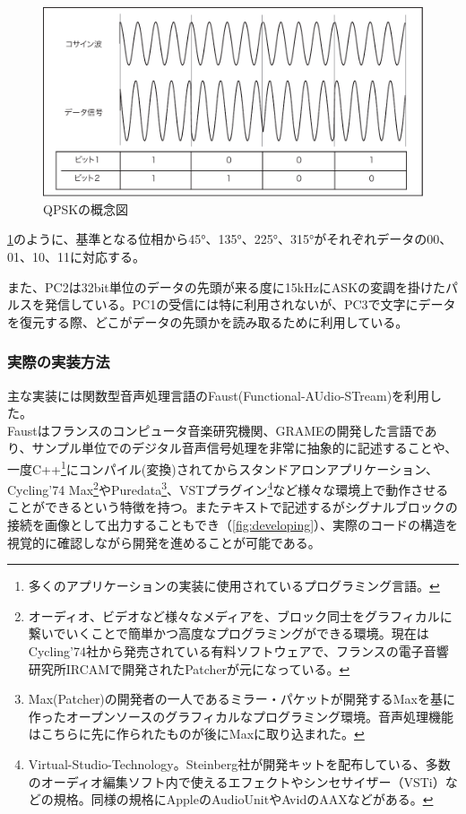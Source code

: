 \documentclass[a4paper,report]{jsbook}
\begin{document}
\begin{figure}[htbp]
\centering
\includegraphics[width=1.00000\textwidth]{./img/qpsk_setsumei.pdf}
\caption{QPSKの概念図\label{fig:qpsk}}
\end{figure}

\cref{fig:qpsk}のように、基準となる位相から45°、135°、225°、315°がそれぞれデータの00、01、10、11に対応する。

また、PC2は32bit単位のデータの先頭が来る度に15kHzにASKの変調を掛けたパルスを発信している。PC1の受信には特に利用されないが、PC3で文字にデータを復元する際、どこがデータの先頭かを読み取るために利用している。

\subsubsection{実際の実装方法}\label{ux5b9fux969bux306eux5b9fux88c5ux65b9ux6cd5}

主な実装には関数型音声処理言語のFaust(Functional-AUdio-STream)を利用した。\\
Faustはフランスのコンピュータ音楽研究機関、GRAMEの開発した言語であり、サンプル単位でのデジタル音声信号処理を非常に抽象的に記述することや、一度C++\footnote{多くのアプリケーションの実装に使用されているプログラミング言語。}にコンパイル(変換)されてからスタンドアロンアプリケーション、Cycling'74
Max\footnote{オーディオ、ビデオなど様々なメディアを、ブロック同士をグラフィカルに繋いでいくことで簡単かつ高度なプログラミングができる環境。現在はCycling'74社から発売されている有料ソフトウェアで、フランスの電子音響研究所IRCAMで開発されたPatcherが元になっている。}やPuredata\footnote{Max(Patcher)の開発者の一人であるミラー・パケットが開発するMaxを基に作ったオープンソースのグラフィカルなプログラミング環境。音声処理機能はこちらに先に作られたものが後にMaxに取り込まれた。}、VSTプラグイン\footnote{Virtual-Studio-Technology。Steinberg社が開発キットを配布している、多数のオーディオ編集ソフト内で使えるエフェクトやシンセサイザー（VSTi）などの規格。同様の規格にAppleのAudioUnitやAvidのAAXなどがある。}など様々な環境上で動作させることができるという特徴を持つ。またテキストで記述するがシグナルブロックの接続を画像として出力することもでき（\cref{fig:developing}）、実際のコードの構造を視覚的に確認しながら開発を進めることが可能である。
\end{document}
